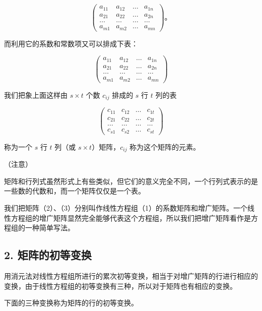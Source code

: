 \[
\left( \begin{array}{cccc} a _ {11} & a _ {12} & \dots & a _ {1 n} \\ a _ {21} & a _ {22} & \dots & a _ {2 n} \\ \dots & \dots & \dots & \dots \\ a _ {m 1} & a _ {m 2} & \dots & a _ {m n} \end{array} \right)\text{。} \tag {2}
\]

而利用它的系数和常数项又可以排成下表：

\[
\left( \begin{array}{cccc} a _ {11} & a _ {12} & \dots & a _ {1 n} \\ a _ {21} & a _ {22} & \dots & a _ {2 n} \\ \dots & \dots & \dots & \dots \\ a _ {m 1} & a _ {m 2} & \dots & a _ {m n} \end{array} \right) \tag {3}
\]

我们把象上面这样由 \(s \times t\) 个数 \(c_{ij}\) 排成的 \(s\) 行 \(t\)
列的表

\[
\left( \begin{array}{cccc} c _ {11} & c _ {12} & \dots & c _ {1 t} \\ c _ {21} & c _ {22} & \dots & c _ {2 t} \\ \dots & \dots & \dots & \dots \\ c _ {s 1} & c _ {s 2} & \dots & c _ {s t} \end{array} \right)
\]

称为一个 \(s\) 行 \(t\) 列（或 \(s \times t\)）矩阵，\(c_{ij}\)
称为这个矩阵的元素。

（注意）

矩阵和行列式虽然形式上有些类似，但它们的意义完全不同，一个行列式表示的是一些数的代数和，而一个矩阵仅仅是一个表。

我们把矩阵（2）、（3）分别叫作线性方程组（1）的系数矩阵和增广矩阵。一个线性方程组的增广矩阵显然完全能够代表这个方程组，所以我们把增广矩阵看作是方程组的一种简单写法。

\subsection{2. 矩阵的初等变换}

用消元法对线性方程组所进行的累次初等变换，相当于对增广矩阵的行进行相应的变换，由于线性方程组的初等变换有三种，所以对于矩阵也有相应的变换。

下面的三种变换称为矩阵的行的初等变换。

